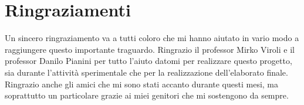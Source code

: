 

\chapter*{Ringraziamenti}
Un sincero ringraziamento va a tutti coloro che mi hanno aiutato in vario modo a raggiungere questo importante traguardo.
Ringrazio il professor Mirko Viroli e il professor Danilo Pianini per tutto l’aiuto datomi per realizzare questo progetto, sia durante l'attività sperimentale che per la realizzazione dell'elaborato finale.
Ringrazio anche gli amici che mi sono stati accanto durante questi mesi, ma soprattutto un particolare grazie ai miei genitori che mi sostengono da sempre.
